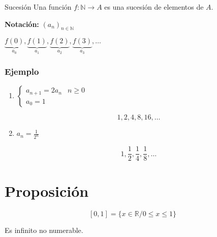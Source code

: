 \begin{definicion}{Sucesión}{}
    Una función $f: \mathbb{N} \to A$ es una sucesión de elementos de $A$.

    \bigskip
    \textbf{Notación:} $\left(a_n\right)_{n \in \mathbb{N}}$

    \medskip
     $\underbrace{f(0)}_{a_0},
    \underbrace{f(1)}_{a_1}, \underbrace{f(2)}_{a_2},
    \underbrace{f(3)}_{a_3}, \dots$
\end{definicion}

\subsubsection{Ejemplo}

\begin{enumerate}
    \item $\begin{cases}
            a_{n+1} = 2 a_n & n \geq 0\\
            a_0 = 1 &
        \end{cases}$

        \[1,2,4,8,16, \dots\]

    \item $a_n = \frac{1}{2^n}$ %

        \[ 1, \frac{1}{2}, \frac{1}{4}, \frac{1}{8} , \dots \]
\end{enumerate}

\section{Proposición}
\begin{proposicion}{}{}
    \[ [0, 1]  = \{ x \in \mathbb{R} / 0 \leq x \leq 1 \} \]

    Es infinito no numerable.
\end{proposicion}

